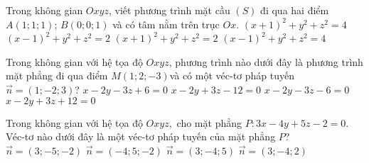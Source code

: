 \begin{ex}%
Trong không gian $Oxyz$, viết phương trình mặt cầu $(S)$ đi qua hai điểm $A(1;1;1)$; $B(0;0;1)$ và có tâm nằm trên trục $Ox$.
\choice
{$\left(x+1\right)^2+y^2+z^2=4$}
	{\True ${\left(x-1\right)}^2+y^2+z^2=2$}
	{${\left(x+1\right)}^2+y^2+z^2=2$}
	{${\left(x-1\right)}^2+y^2+z^2=4$}
\end{ex}
\begin{ex}%
	Trong không gian với hệ tọa độ $Oxyz$, phương trình nào dưới đây là phương trình mặt phẳng đi qua điểm $M(1;2;-3)$và có một véc-tơ pháp tuyến $\vec{n}=(1;-2;3)$?
	\choice
	{$x-2y-3z+6=0$}
	{$x-2y+3z-12=0$}
	{$x-2y-3z-6=0$}
	{\True $x-2y+3z+12=0$}
\end{ex}
\begin{ex}%
	Trong không gian với hệ tọa độ $Oxyz,$ cho mặt phẳng $P:3x-4y+5z-2=0$. Véc-tơ nào dưới đây là một véc-tơ pháp tuyến của mặt phẳng $P$?
	\choice
	{$\vec{n}=\left(3;-5;-2\right)$}
	{$\vec{n}=\left(-4;5;-2\right)$}
	{\True $\vec{n}=\left(3;-4;5\right)$}
	{$\vec{n}=\left(3;-4;2\right)$}
\end{ex}

